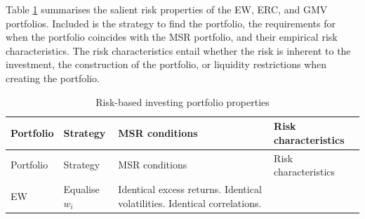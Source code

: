 \documentclass[
]{article}
\begin{document}
Table \ref{tab:rbportprops} summarises the salient risk properties of the EW, ERC, and GMV
portfolios. Included is the strategy to find the portfolio, the requirements for when the portfolio
coincides with the MSR portfolio, and their empirical risk characteristics. The risk characteristics
entail whether the risk is inherent to the investment, the construction of the portfolio, or liquidity
restrictions when creating the portfolio.

\begin{longtable}[]{@{}llll@{}}
\caption{\label{tab:rbportprops} Risk-based investing portfolio properties \citet{J13}}\tabularnewline
\toprule
\begin{minipage}[b]{0.06\columnwidth}\raggedright
Portfolio\strut
\end{minipage} & \begin{minipage}[b]{0.09\columnwidth}\raggedright
Strategy\strut
\end{minipage} & \begin{minipage}[b]{0.39\columnwidth}\raggedright
MSR conditions\strut
\end{minipage} & \begin{minipage}[b]{0.34\columnwidth}\raggedright
Risk characteristics\strut
\end{minipage}\tabularnewline
\midrule
\endfirsthead
\toprule
\begin{minipage}[b]{0.06\columnwidth}\raggedright
Portfolio\strut
\end{minipage} & \begin{minipage}[b]{0.09\columnwidth}\raggedright
Strategy\strut
\end{minipage} & \begin{minipage}[b]{0.39\columnwidth}\raggedright
MSR conditions\strut
\end{minipage} & \begin{minipage}[b]{0.34\columnwidth}\raggedright
Risk characteristics\strut
\end{minipage}\tabularnewline
\midrule
\endhead
\begin{minipage}[t]{0.06\columnwidth}\raggedright
EW\strut
\end{minipage} & \begin{minipage}[t]{0.09\columnwidth}\raggedright
Equalise \(w_i\)\strut
\end{minipage} & \begin{minipage}[t]{0.39\columnwidth}\raggedright
Identical excess returns. Identical volatilities. Identical correlations.\strut
\end{minipage} & \begin{minipage}[t]{0.34\columnwidth}\raggedright

\end{minipage}
\end{longtable}
\end{document}
